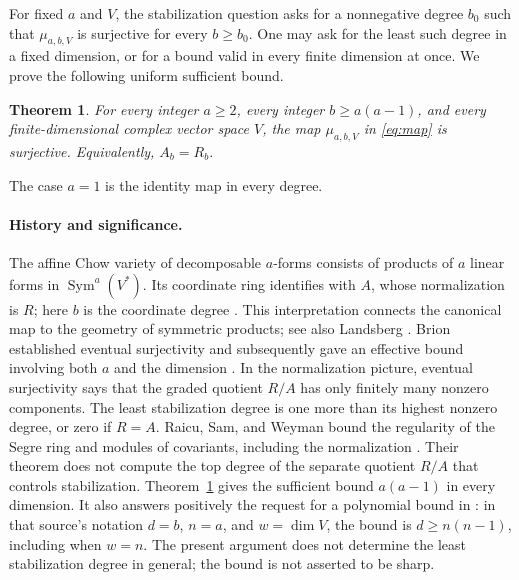 \documentclass[11pt]{article}
\newtheorem{theorem}{Theorem}
\theoremstyle{remark}
\DeclareMathOperator{\Sym}{Sym}
\begin{document}
For fixed $a$ and $V$, the stabilization question asks for a nonnegative degree $b_0$
such that $\mu_{a,b,V}$ is surjective for every $b\ge b_0$. One may ask for
the least such degree in a fixed dimension, or for a bound valid in every
finite dimension at once. We prove the following uniform sufficient bound.

\begin{theorem}\label{thm:main}
For every integer $a\ge2$, every integer $b\ge a(a-1)$, and every
finite-dimensional complex vector space $V$, the map
$\mu_{a,b,V}$ in \eqref{eq:map} is surjective. Equivalently, $A_b=R_b$.
\end{theorem}

The case $a=1$ is the identity map in every degree.

\paragraph{History and significance.}
The affine Chow variety of decomposable $a$-forms consists of products of
$a$ linear forms in $\Sym^a(V^*)$. Its coordinate ring identifies with
$A$, whose normalization is $R$; here $b$ is the coordinate degree
\cite[Section~2, Theorem~2.3]{RSW}. This interpretation connects the canonical map to
the geometry of symmetric products; see also
Landsberg \cite[Section~7.6, Propositions~7.11--7.12]{Landsberg}.
Brion established eventual surjectivity \cite{Brion1993} and subsequently
gave an effective bound involving both $a$ and the dimension
\cite[Theorem~3.3]{Brion}. In the normalization picture, eventual
surjectivity says that the graded quotient $R/A$ has only finitely many
nonzero components. The least stabilization degree is one more than its
highest nonzero degree, or zero if $R=A$. Raicu, Sam, and Weyman bound the
regularity of the Segre ring and modules of covariants, including the
normalization \cite[Theorem~3.9]{RSW}. Their theorem does not compute the
top degree of the separate quotient $R/A$ that controls stabilization.
Theorem~\ref{thm:main} gives the sufficient bound $a(a-1)$ in every dimension.
It also answers positively the request for a polynomial bound in
\cite[Problem~7.19]{Landsberg}: in that source's notation $d=b$, $n=a$,
and $w=\dim V$, the bound is $d\ge n(n-1)$, including when $w=n$.
The present argument does not determine the least stabilization degree
in general; the bound is not asserted to be sharp.
\end{document}
